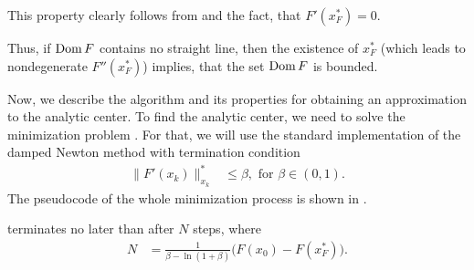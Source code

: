 This property clearly follows from  and the fact, that $F'(x^*_F) = 0$.

Thus, if $\operatorname{Dom} F$ contains no straight line, then the existence of $x^*_F$ (which leads to nondegenerate $F''(x^*_F)$) implies, that the set $\operatorname{Dom} F$ is bounded.

Now, we describe the algorithm and its properties for obtaining an approximation to the analytic center.
To find the analytic center, we need to solve the minimization problem .
For that, we will use the standard implementation of the damped Newton method with termination condition
\begin{align}
  \|F'(x_k)\|^*_{x_k} &\leq \beta, \text{ for } \beta\in(0,1).
\end{align}
The pseudocode of the whole minimization process is shown in .



\begin{theorem}
   terminates no later than after $N$ steps, where
  \begin{align}
    N &= \frac{1}{\beta - \ln(1+\beta)}\big(F(x_0) - F(x^*_F)\big).
  \end{align}
\end{theorem}

